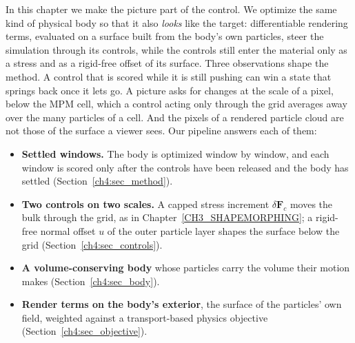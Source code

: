 In this chapter we make the picture part of the control. We optimize the same kind of physical body so that it also
\emph{looks} like the target: differentiable rendering terms, evaluated on a surface built from the body's own particles,
steer the simulation through its controls, while the controls still enter the material only as a stress and as a
rigid-free offset of its surface. Three observations shape the method. A control that is scored while it is still pushing
can win a state that springs back once it lets go. A picture asks for changes at the scale of a pixel, below the MPM
cell, which a control acting only through the grid averages away over the many particles of a cell. And the pixels of a
rendered particle cloud are not those of the surface a viewer sees. Our pipeline answers each of them:
\begin{itemize}
  \item \textbf{Settled windows.} The body is optimized window by window, and each window is scored only after the
        controls have been released and the body has settled (Section~\ref{ch4:sec_method}).
  \item \textbf{Two controls on two scales.} A capped stress increment $\delta\mathbf{F}_c$ moves the bulk through the
        grid, as in Chapter~\ref{CH3_SHAPEMORPHING}; a rigid-free normal offset $u$ of the outer particle layer shapes the
        surface below the grid (Section~\ref{ch4:sec_controls}).
  \item \textbf{A volume-conserving body} whose particles carry the volume their motion makes
        (Section~\ref{ch4:sec_body}).
  \item \textbf{Render terms on the body's exterior}, the surface of the particles' own field, weighted against a
        transport-based physics objective (Section~\ref{ch4:sec_objective}).
\end{itemize}

